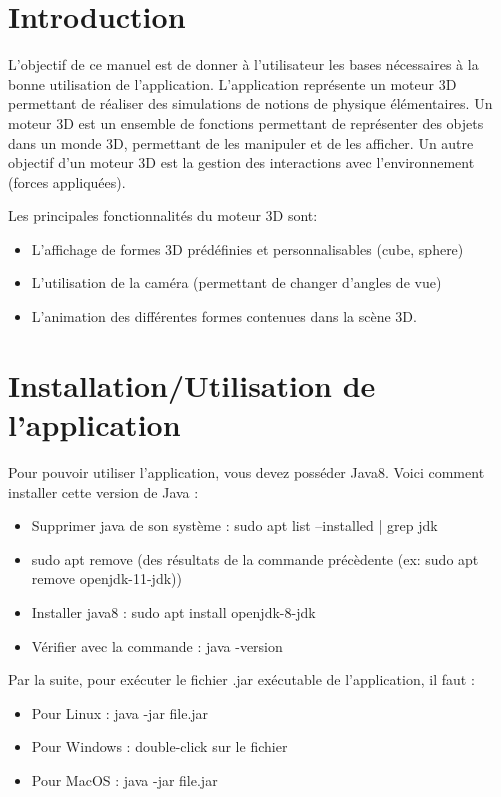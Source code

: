 \documentclass[11pt]{report}
\begin{document}


\tableofcontents

\chapter{Introduction}
L'objectif de ce manuel est de donner à l'utilisateur les bases nécessaires à la bonne utilisation de l'application.
L'application représente un moteur 3D permettant de réaliser des simulations de notions de physique élémentaires.
Un moteur 3D est un ensemble de fonctions permettant de représenter des objets dans un monde 3D, permettant de les
manipuler et de les afficher. Un autre objectif d'un moteur 3D est la gestion des interactions avec l'environnement (forces appliquées). \newline \newline


Les principales fonctionnalités du moteur 3D sont:
\begin{itemize}
        \item L'affichage de formes 3D prédéfinies et personnalisables (cube, sphere)
        \item L'utilisation de la caméra (permettant de changer d'angles de vue)
        \item L'animation des différentes formes contenues dans la scène 3D.
\end{itemize}

\chapter{Installation/Utilisation de l'application}

Pour pouvoir utiliser l'application, vous devez posséder Java8.
Voici comment installer cette version de Java :
\begin{itemize}
  \item Supprimer java de son système : sudo apt list --installed | grep jdk
  \item sudo apt remove (des résultats de la commande précèdente (ex: sudo apt remove openjdk-11-jdk))
  \item Installer java8 : sudo apt install openjdk-8-jdk
  \item Vérifier avec la commande : java -version\newline
\end{itemize}

Par la suite, pour exécuter le fichier .jar exécutable de l'application, il faut :
\begin{itemize}
  \item Pour Linux : java -jar file.jar
  \item Pour Windows : double-click sur le fichier
  \item Pour MacOS : java -jar file.jar\newline
\end{itemize}
\end{document}
